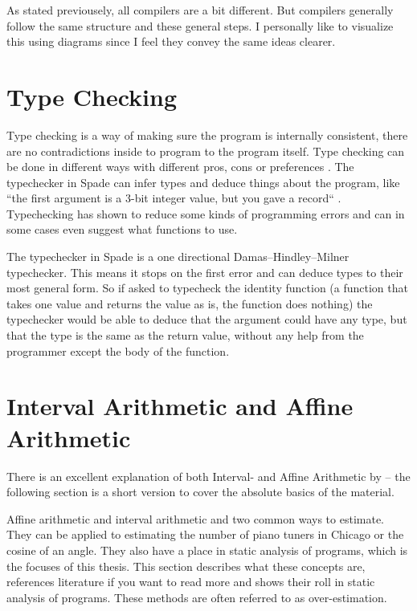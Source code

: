 \documentclass[msc,lith,english]{liuthesis}
\begin{document}
\cite{src:DragonBook}\cite{src:CraftingInterp}\cite{src:KKLectures}

As stated previousely, all compilers are a bit different. But compilers generally follow the same structure and these general steps. I personally like to visualize this using diagrams since I feel they convey the same ideas clearer.


\section{Type Checking} %
\label{sec:TypeChecking}
Type checking is a way of making sure the program is internally consistent, there are no contradictions inside to program to the program itself. Type checking can be done in different ways with different pros, cons or preferences \cite{src:TypeCheckersBook}. The typechecker in Spade can infer types and deduce things about the program, like ``the first argument is a 3-bit integer value, but you gave a record`` \cite{src:spadeAnHDL}. Typechecking has shown to reduce some kinds of programming errors and can in some cases even suggest what functions to use.

The typechecker in Spade is a one directional Damas–Hindley–Milner typechecker. This means it stops on the first error and can deduce types to their most general form. So if asked to typecheck the identity function (a function that takes one value and returns the value as is, the function does nothing) the typechecker would be able to deduce that the argument could have any type, but that the type is the same as the return value, without any help from the programmer except the body of the function. \cite{src:DamasHindleyMilner}


\section{Interval Arithmetic and Affine Arithmetic}
\label{sec:IAandAA}

There is an excellent explanation of both Interval- and Affine Arithmetic by \citeauthor{src:affAri} -- the following section is a short version to cover the absolute basics of the material.

Affine arithmetic and interval arithmetic and two common ways to estimate. They can be applied to estimating the number of piano tuners in Chicago or the cosine of an angle. They also have a place in static analysis of programs, which is the focuses of this thesis. This section describes what these concepts are, references literature if you want to read more and shows their roll in static analysis of programs. These methods are often referred to as over-estimation.
\end{document}
